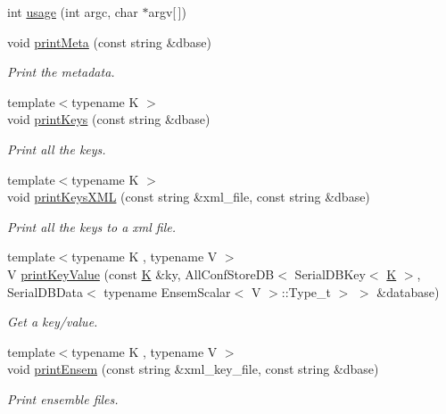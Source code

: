 \begin{DoxyCompactItemize}
\item 
int \mbox{\hyperlink{namespaceedb__reader_a813c5a58e50141034390e821ed895942}{usage}} (int argc, char $\ast$argv\mbox{[}$\,$\mbox{]})
\item 
void \mbox{\hyperlink{namespaceedb__reader_a9caf0c894a49fc4a9829aead7ec614fd}{print\+Meta}} (const string \&dbase)
\begin{DoxyCompactList}\small\item\em Print the metadata. \end{DoxyCompactList}\item 
{\footnotesize template$<$typename K $>$ }\\void \mbox{\hyperlink{namespaceedb__reader_af770eded7bd6582e1e379f54c13bd0c2}{print\+Keys}} (const string \&dbase)
\begin{DoxyCompactList}\small\item\em Print all the keys. \end{DoxyCompactList}\item 
{\footnotesize template$<$typename K $>$ }\\void \mbox{\hyperlink{namespaceedb__reader_add7c23b7ba3986c35bcaa28611526f89}{print\+Keys\+X\+ML}} (const string \&xml\+\_\+file, const string \&dbase)
\begin{DoxyCompactList}\small\item\em Print all the keys to a xml file. \end{DoxyCompactList}\item 
{\footnotesize template$<$typename K , typename V $>$ }\\V \mbox{\hyperlink{namespaceedb__reader_aa1903de7bccd11ada11d0166e1662064}{print\+Key\+Value}} (const \mbox{\hyperlink{test__db_8cc_ab54a55a9054a3f0247c74233453ae568}{K}} \&ky, All\+Conf\+Store\+DB$<$ Serial\+D\+B\+Key$<$ \mbox{\hyperlink{test__db_8cc_ab54a55a9054a3f0247c74233453ae568}{K}} $>$, Serial\+D\+B\+Data$<$ typename Ensem\+Scalar$<$ V $>$\+::Type\+\_\+t $>$ $>$ \&database)
\begin{DoxyCompactList}\small\item\em Get a key/value. \end{DoxyCompactList}\item 
{\footnotesize template$<$typename K , typename V $>$ }\\void \mbox{\hyperlink{namespaceedb__reader_ae02dd53c91dd84ab984521559b49306f}{print\+Ensem}} (const string \&xml\+\_\+key\+\_\+file, const string \&dbase)
\begin{DoxyCompactList}\small\item\em Print ensemble files. \end{DoxyCompactList}\item 

\end{DoxyCompactItemize}
